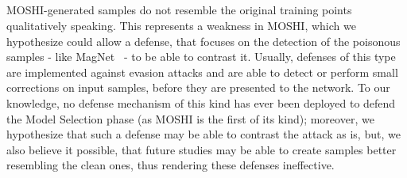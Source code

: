 \subsection{}
\label{subsec:counter}
MOSHI-generated samples do not resemble the original training points qualitatively speaking. 
This represents a weakness in MOSHI, which we hypothesize could allow a defense, that focuses on the detection of the poisonous samples - like MagNet~\cite{2017magnet} - to be able to contrast it.
Usually, defenses of this type are implemented against evasion attacks and are able to detect or perform small corrections on input samples, before they are presented to the network.
To our knowledge, no defense mechanism of this kind has ever been deployed to defend the Model Selection phase (as MOSHI is the first of its kind); moreover, we hypothesize that such a defense may be able to contrast the attack as is, but, we also believe it possible, that future studies may be able to create samples better resembling the clean ones, thus rendering these defenses ineffective.